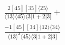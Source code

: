 \documentclass[varwidth, border=5pt]{standalone}
\begin{document}
\begin{my}
$\begin{gathered}
\scriptscriptstyle\frac{2[45][35]⟨25⟩}{⟨13⟩⟨45⟩⟨3|1+2|3]}+\\
\scriptscriptstyle\frac{-1[45][34]⟨12⟩⟨34⟩}{⟨13⟩^2⟨45⟩⟨3|1+2|3]}\phantom{+}
\end{gathered}$
\end{my}
\end{document}
